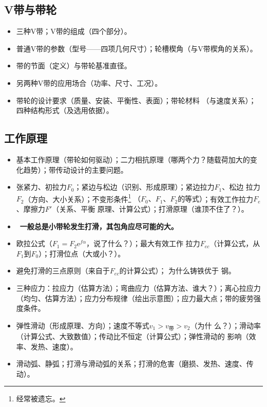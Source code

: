 \documentclass[12pt,a4paper]{article}
\newcommand{\tightlist}{\setlength{\parskip}{0pt}\setlength{\itemsep}{0pt}}
\newcommand{\hint}[1]{\textsf{（#1）}}
\newcommand{\minor}[1]{{\color{gray} #1}}
\renewcommand{\emph}[1]{\faIcon[regular]{lightbulb}\ \textbf{#1}}
\begin{document}
\subsection{V带与带轮}
\begin{itemize}\tightlist
    \item 三种V带；V带的组成\hint{四个部分}。
    \item 普通V带的参数\hint{型号——四项几何尺寸}；轮槽楔角\hint{与V带楔角的关系}。
    \item 带的节面\hint{定义}与带轮基准直径。
    \item \minor{另两种V带的应用场合\hint{功率、尺寸、工况}。}
    \item \minor{带轮的设计要求\hint{质量、安装、平衡性、表面}；}带轮材料
    \hint{与速度关系}；\minor{四种结构形式\hint{及选用依据}。}
\end{itemize}

\subsection{工作原理}
\begin{itemize}\tightlist
    \item 基本工作原理\hint{带轮如何驱动}；二力相抗原理\hint{哪两个力？随载荷加大的变
    化趋势}；带传动设计的主要问题。
    \item 张紧力、初拉力$F_0$；紧边与松边\hint{识别、形成原理}；紧边拉力$F_1$、松边
    拉力$F_2$\hint{方向、大小关系}；不变形条件\footnote{经常被遗忘。}
    \hint{$F_0$、$F_1$、$F_2$的等式}；有效工作拉力$F_e$、摩擦力$F'$\hint{关系、平衡
    原理、计算公式}；打滑原理\hint{谁顶不住了？}。
    \item \emph{一般总是小带轮发生打滑，其包角应尽可能的大。}
    \item 欧拉公式\hint{$F_1=F_2\mathrm{e}^{f\alpha}$，说了什么？}；最大有效工作
    拉力$F_{ec}$\hint{计算公式，从$F_1$到$F_0$}；打滑位点\hint{大或小？}。
    \item 避免打滑的三点原则\hint{来自于$F_{ec}$的计算公式}；\minor{为什么铸铁优于
    钢。}
    \item 三种应力：拉应力\hint{估算方法}；弯曲应力\hint{估算方法、谁大？}；离心拉应力
    \hint{均匀、估算方法}；应力分布规律\hint{绘出示意图}；应力最大点；带的疲劳强度条件。
    \item 弹性滑动\hint{形成原理、方向}；速度不等式$v_1>v_\text{带}>v_2$\hint{为什
    么？}；滑动率\hint{计算公式、大致数值}；传动比不恒定\hint{计算公式}；弹性滑动的
    影响\hint{效率、发热、速度}。
    \item 滑动弧、静弧；打滑与滑动弧的关系；打滑的危害\hint{磨损、发热、速度、传动}。
\end{itemize}
\end{document}
